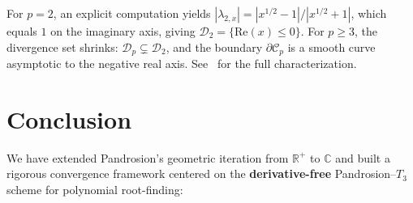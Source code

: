 \documentclass[11pt,a4paper]{article}
\theoremstyle{definition}
\newcommand{\CC}{\mathbb{C}}
\newcommand{\RR}{\mathbb{R}}
\newcommand{\Div}{\mathcal{D}}
\begin{document}
For $p = 2$, an explicit computation yields $|\lambda_{2,x}| = |x^{1/2} - 1|/|x^{1/2} + 1|$, which equals $1$ on the imaginary axis, giving $\Div_2 = \{\mathrm{Re}(x) \leq 0\}$.  For $p \geq 3$, the divergence set shrinks: $\Div_p \subsetneq \Div_2$, and the boundary $\partial \mathcal{C}_p$ is a smooth curve asymptotic to the negative real axis.  See~\cite[\S7]{besevic2026complex} for the full characterization.

\section{Conclusion}
\label{sec:conclusion_complex}

We have extended Pandrosion's geometric iteration from $\RR^+$ to $\CC$ and built a rigorous convergence framework centered on the \textbf{derivative-free} Pandrosion--$T_3$ scheme for polynomial root-finding:
\end{document}
